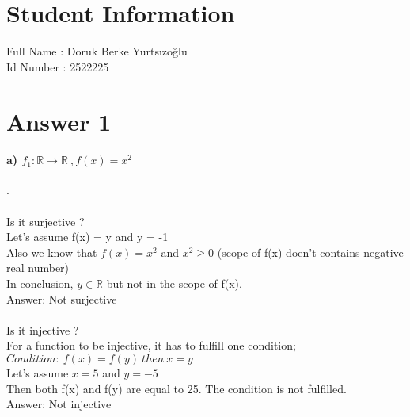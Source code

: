 \documentclass[12pt]{article}
\begin{document}
\section*{Student Information } 
Full Name : Doruk Berke Yurtsızoğlu \\
Id Number : 2522225 \\

\section*{Answer 1}

\paragraph{a) $f_1: \mathbb{R} \rightarrow \mathbb{R} \ , f(x) = x^2$}
.\\
\\
Is it surjective ? \\
Let's assume f(x) = y and y = -1\\
Also we know that $f(x) = x^2$ and $x^2 \geq 0$ (scope of f(x) doen't contains negative real number)\\
In conclusion, $y \in \mathbb{R}$ but not in the scope of f(x).\\
Answer: Not surjective\\ 
\\
Is it injective ? \\
For a function to be injective, it has to fulfill one condition;\\
$Condition: \ f(x) = f(y)\ then\ x = y $ \\
Let's assume $x = 5$ and $y = -5$\\
Then both f(x) and f(y) are equal to 25. The condition is not fulfilled.\\
Answer: Not injective\\

			 
\end{document}
